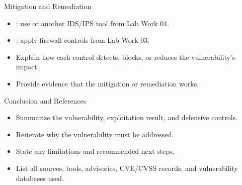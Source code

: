 \begin{frame}[t]{Mitigation and Remediation}
\begin{itemize}
  \setlength{\itemsep}{0.25cm}
  \item {}: use  or another IDS/IPS tool from Lab Work 04.
  \item {}: apply firewall controls from Lab Work 03.
  \item Explain how each control detects, blocks, or reduces the vulnerability's impact.
  \item Provide evidence that the mitigation or remediation works.
\end{itemize}
\end{frame}

\begin{frame}[t]{Conclusion and References}
\begin{itemize}
  \setlength{\itemsep}{0.28cm}
  \item Summarize the vulnerability, exploitation result, and defensive controls.
  \item Reiterate why the vulnerability must be addressed.
  \item State any limitations and recommended next steps.
  \item List all sources, tools, advisories, CVE/CVSS records, and vulnerability databases used.
\end{itemize}
\end{frame}
